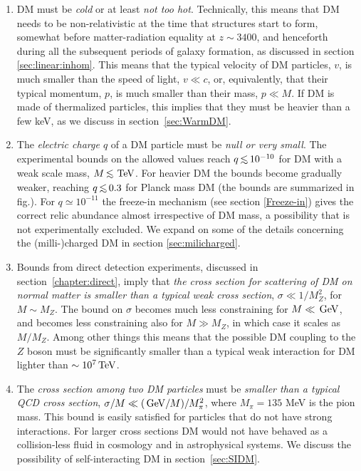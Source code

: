 \begin{enumerate}
\item DM must be {\em cold} or at least {\em not too hot}. Technically, this means that DM needs to be non-relativistic at the time that structures start to form, somewhat before matter-radiation equality at $z \sim 3400$,
and henceforth during all the subsequent periods of galaxy formation, as discussed in section \ref{sec:linear:inhom}. 
This means that the typical velocity of DM particles, $v$, is much smaller than the speed of light, $v \ll c$, or, equivalently, that their typical momentum, $p$, is much smaller than their mass, $p \ll M$.
If DM is made of thermalized particles, this implies that they must be heavier than a few keV, as we discuss in section~\ref{sec:WarmDM}.
\item  The {\em electric charge $q$} of a DM particle must be {\em null or very small}.
The experimental bounds on the allowed values reach $q\circa{<}10^{-10}$ for DM with a weak scale mass, $M\circa{<}\TeV$.  For heavier DM the bounds become gradually weaker, reaching $q\circa{<}0.3$ for  Planck mass DM (the bounds are summarized in fig.). For $q\simeq 10^{-11}$ the freeze-in mechanism (see section \ref{Freeze-in}) gives the correct relic abundance almost irrespective of DM mass, a possibility that is not experimentally excluded. We expand on some of the details concerning the (milli-)charged DM in section \ref{sec:milicharged}.





\item  Bounds from direct detection experiments, discussed in section~\ref{chapter:direct}, imply that
{\em the cross section for scattering of DM on normal matter is smaller than a typical weak cross section},
 $\sigma \ll 1/M_Z^2$, for $M \sim M_Z$.
The bound on $\sigma$ becomes much less constraining for $M \ll \,{\rm GeV}$, and becomes less constraining also for $M \gg M_Z$, in which case it scales as $M/M_Z$. 
Among other things this means that the possible DM coupling to the $Z$ boson must be significantly smaller than a typical weak interaction
for DM lighter than $\sim 10^7\,{\rm TeV}$.


\item  The {\em cross section among two DM particles} must be {\em smaller than a typical QCD cross section}, 
$\sigma/M \ll  (\,{\rm GeV}/M)/M_\pi^2$, where $M_\pi=135$ MeV  is the pion mass. This bound is easily satisfied for particles that do not have strong interactions.
For larger cross sections DM would not have behaved as a collision-less fluid in cosmology and in astrophysical systems. We discuss the possibility of self-interacting DM in section~\ref{sec:SIDM}.


\end{enumerate}
